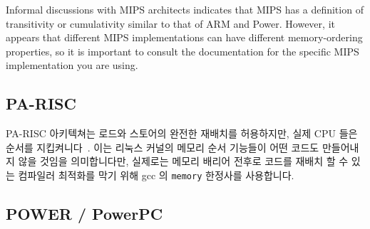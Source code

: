 Informal discussions with MIPS architects indicates that MIPS has a
definition of transitivity or cumulativity similar to that of
ARM and Power.
However, it appears that different MIPS implementations can have
different memory-ordering properties, so it is important to consult
the documentation for the specific MIPS implementation you are using.
\fi

\subsection{PA-RISC}

PA-RISC 아키텍쳐는 로드와 스토어의 완전한 재배치를 허용하지만, 실제 CPU 들은
순서를 지킵켜니다~\cite{GerryKane96a}.
이는 리눅스 커널의 메모리 순서 기능들이 어떤 코드도 만들어내지 않을 것임을
의미합니다만, 실제로는 메모리 배리어 전후로 코드를 재배치 할 수 있는 컴파일러
최적화를 막기 위해 gcc 의 {\tt memory} 한정사를 사용합니다.

\subsection{POWER / PowerPC}
\label{sec:app:whymb:POWER / PowerPC}

